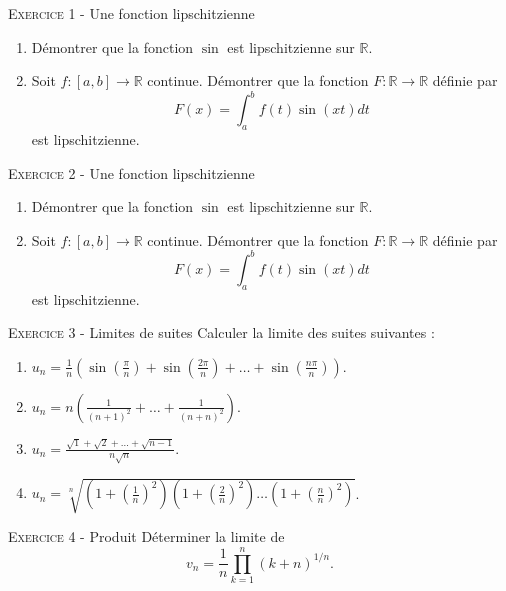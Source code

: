 \documentclass[11pt]{article}
\newcommand{\dis}{\displaystyle}
\begin{document}
 

\begin{center}\textsc{{\huge }}\end{center}



\vskip0.3cm\noindent\textsc{Exercice 1} - Une fonction lipschitzienne
\vskip0.2cm
\begin{enumerate}
\item Démontrer que la fonction $\sin$ est lipschitzienne sur $\mathbb R$.
\item Soit $f:[a,b]\to\mathbb R$ continue. Démontrer que la fonction $F:\mathbb R\to\mathbb R$ définie par 
$$F(x)=\int_a^b f(t)\sin(xt)dt$$
est lipschitzienne.
\end{enumerate}




\vskip0.3cm\noindent\textsc{Exercice 2} - Une fonction lipschitzienne
\vskip0.2cm
\begin{enumerate}
\item Démontrer que la fonction $\sin$ est lipschitzienne sur $\mathbb R$.
\item Soit $f:[a,b]\to\mathbb R$ continue. Démontrer que la fonction $F:\mathbb R\to\mathbb R$ définie par 
$$F(x)=\int_a^b f(t)\sin(xt)dt$$
est lipschitzienne.
\end{enumerate}




\vskip0.3cm\noindent\textsc{Exercice 3} - Limites de suites
\vskip0.2cm
Calculer la limite des suites suivantes :
\begin{enumerate}
\item $\dis u_n=\frac 1n\left(\sin\left(\frac{\pi}{n}\right)+\sin\left(\frac{2\pi}{n}\right)+\dots+\sin\left(\frac{n\pi}{n}\right)\right).$
\item $\dis u_n=n\left(\frac{1}{(n+1)^2}+\dots+\frac{1}{(n+n)^2}\right).$
\item $\dis u_n=\frac{\sqrt{1}+\sqrt{2}+\dots+\sqrt{n-1}}{n\sqrt{n}}.$
\item $\dis u_n=\sqrt[n]{\left(1+\left(\frac{1}{n}\right)^2\right)\left(1+\left(\frac{2}{n}\right)^2\right)\dots\left(1+\left(\frac{n}{n}\right)^2\right)}$.
\end{enumerate}




\vskip0.3cm\noindent\textsc{Exercice 4} - Produit
\vskip0.2cm
Déterminer la limite de 
$$v_n=\frac1n\prod_{k=1}^n (k+n)^{1/n}.$$


\end{document}
